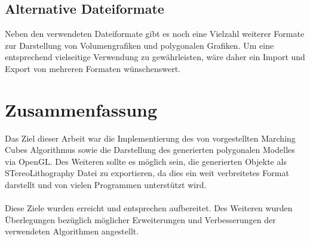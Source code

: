 \subsection{Alternative Dateiformate}
Neben den verwendeten Dateiformate gibt es noch eine Vielzahl weiterer Formate zur Darstellung von Volumengrafiken und polygonalen Grafiken. Um eine entsprechend vielseitige Verwendung zu gewährleisten, wäre daher ein Import und Export von mehreren Formaten wünschenswert.

\section{Zusammenfassung}
Das Ziel dieser Arbeit war die Implementierung des von \citep{MCAlgo} vorgestellten Marching Cubes Algorithmus sowie die Darstellung des generierten polygonalen Modelles via OpenGL. Des Weiteren sollte es möglich sein, die generierten Objekte als STereoLithography Datei zu exportieren, da dies ein weit verbreitetes Format darstellt und von vielen Programmen unterstützt wird.\\
\\
Diese Ziele wurden erreicht und entsprechen aufbereitet. Des Weiteren wurden Überlegungen bezüglich möglicher Erweiterungen und Verbesserungen der verwendeten Algorithmen angestellt. 